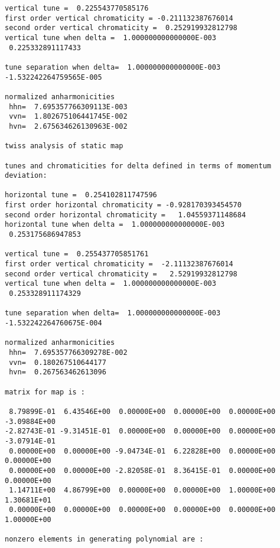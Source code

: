 {\begin{verbatim}
vertical tune =  0.225543770585176
first order vertical chromaticity = -0.211132387676014
second order vertical chromaticity =  0.252919932812798
vertical tune when delta =  1.000000000000000E-003
 0.225332891117433

tune separation when delta=  1.000000000000000E-003
-1.532242264759565E-005

normalized anharmonicities
 hhn=  7.695357766309113E-003
 vvn=  1.802675106441745E-002
 hvn=  2.675634626130963E-002

twiss analysis of static map

tunes and chromaticities for delta defined in terms of momentum deviation:

horizontal tune =  0.254102811747596
first order horizontal chromaticity = -0.928170393454570
second order horizontal chromaticity =   1.04559371148684
horizontal tune when delta =  1.000000000000000E-003
 0.253175686947853

vertical tune =  0.255437705851761
first order vertical chromaticity =  -2.11132387676014
second order vertical chromaticity =   2.52919932812798
vertical tune when delta =  1.000000000000000E-003
 0.253328911174329

tune separation when delta=  1.000000000000000E-003
-1.532242264760675E-004

normalized anharmonicities
 hhn=  7.695357766309278E-002
 vvn=  0.180267510644177
 hvn=  0.267563462613096

matrix for map is :

 8.79899E-01  6.43546E+00  0.00000E+00  0.00000E+00  0.00000E+00 -3.09884E+00
-2.82743E-01 -9.31451E-01  0.00000E+00  0.00000E+00  0.00000E+00 -3.07914E-01
 0.00000E+00  0.00000E+00 -9.04734E-01  6.22828E+00  0.00000E+00  0.00000E+00
 0.00000E+00  0.00000E+00 -2.82058E-01  8.36415E-01  0.00000E+00  0.00000E+00
 1.14711E+00  4.86799E+00  0.00000E+00  0.00000E+00  1.00000E+00  1.30681E+01
 0.00000E+00  0.00000E+00  0.00000E+00  0.00000E+00  0.00000E+00  1.00000E+00

nonzero elements in generating polynomial are :


\end{verbatim}}
